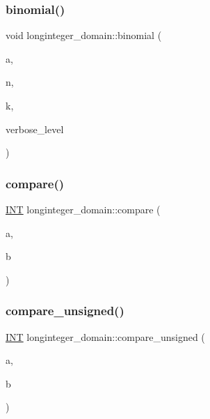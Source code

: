 \subsubsection{\texorpdfstring{binomial()}{binomial()}}
{\footnotesize\ttfamily void longinteger\+\_\+domain\+::binomial (\begin{DoxyParamCaption}\item[{\mbox{\hyperlink{classlonginteger__object}{longinteger\+\_\+object}} \&}]{a,  }\item[{\mbox{\hyperlink{galois_8h_a09fddde158a3a20bd2dcadb609de11dc}{I\+NT}}}]{n,  }\item[{\mbox{\hyperlink{galois_8h_a09fddde158a3a20bd2dcadb609de11dc}{I\+NT}}}]{k,  }\item[{\mbox{\hyperlink{galois_8h_a09fddde158a3a20bd2dcadb609de11dc}{I\+NT}}}]{verbose\+\_\+level }\end{DoxyParamCaption})}

\mbox{\label{classlonginteger__domain_a6780a80b91bf044dde737578b2e19a02}} 
\subsubsection{\texorpdfstring{compare()}{compare()}}
{\footnotesize\ttfamily \mbox{\hyperlink{galois_8h_a09fddde158a3a20bd2dcadb609de11dc}{I\+NT}} longinteger\+\_\+domain\+::compare (\begin{DoxyParamCaption}\item[{\mbox{\hyperlink{classlonginteger__object}{longinteger\+\_\+object}} \&}]{a,  }\item[{\mbox{\hyperlink{classlonginteger__object}{longinteger\+\_\+object}} \&}]{b }\end{DoxyParamCaption})}

\mbox{\label{classlonginteger__domain_ad4328779ebda00cbf85f5bddcc1a125f}} 
\subsubsection{\texorpdfstring{compare\+\_\+unsigned()}{compare\_unsigned()}}
{\footnotesize\ttfamily \mbox{\hyperlink{galois_8h_a09fddde158a3a20bd2dcadb609de11dc}{I\+NT}} longinteger\+\_\+domain\+::compare\+\_\+unsigned (\begin{DoxyParamCaption}\item[{\mbox{\hyperlink{classlonginteger__object}{longinteger\+\_\+object}} \&}]{a,  }\item[{\mbox{\hyperlink{classlonginteger__object}{longinteger\+\_\+object}} \&}]{b }\end{DoxyParamCaption})}

